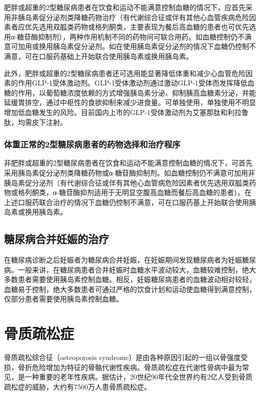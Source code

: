 肥胖或超重的2型糖尿病患者在饮食和运动不能满意控制血糖的情况下，应首先采用非胰岛素促分泌剂类降糖药物治疗（有代谢综合征或伴有其他心血管疾病危险因素者应优先选用双胍类药物或格列酮类，主要表现为餐后高血糖的患者也可优先选用α-糖苷酶抑制剂），两种作用机制不同的药物间可联合用药。如血糖控制仍不满意可加用或换用胰岛素促分泌剂。如在使用胰岛素促分泌剂的情况下血糖仍控制不满意，可在口服药基础上开始联合使用胰岛素或换用胰岛素。

此外，肥胖或超重的2型糖尿病患者还可选用能显著降低体重和减少心血管危险因素的作用GLP-1受体激动剂。GLP-1受体激动剂通过激动GLP-1受体而发挥降低血糖的作用，以葡萄糖浓度依赖的方式增强胰岛素分泌、抑制胰高血糖素分泌，并能延缓胃排空，通过中枢性的食欲抑制来减少进食量。可单独使用，单独使用不明显增加低血糖发生的风险。目前国内上市的GLP-1受体激动剂为艾塞那肽和利拉鲁肽，均需皮下注射。

\subsubsection{体重正常的2型糖尿病患者的药物选择和治疗程序}

非肥胖或超重的2型糖尿病患者在饮食和运动不能满意控制血糖的情况下，可首先采用胰岛素促分泌剂类降糖药物或α-糖苷酶抑制剂。如血糖控制仍不满意可加用非胰岛素促分泌剂（有代谢综合征或伴有其他心血管病危险因素者优先选用双胍类药物或格列酮类，α-糖苷酶抑剂适用于无明显空腹高血糖而餐后高血糖的患者）。在上述口服药联合治疗的情况下血糖仍控制不满意，可在口服药基上开始联合使用胰岛素或换用胰岛素。

\subsection{糖尿病合并妊娠的治疗}

在糖尿病诊断之后妊娠者为糖尿病合并妊娠，在妊娠期间发现糖尿病者为妊娠糖尿病。一般来讲，在糖尿病患者合并妊娠时血糖水平波动较大，血糖较难控制，绝大多数患者需要使用胰岛素控制血糖。相反，妊娠糖尿病患者的血糖波动相对较轻，血糖易于控制，绝大多数患者可通过严格的饮食计划和运动使血糖得到满意控制，仅部分患者需要使用胰岛素控制血糖。

\section{骨质疏松症}

骨质疏松综合征（osteoporosis
syndrome）是由各种原因引起的一组以骨强度受损，骨折危险增加为特征的骨骼代谢性疾病。骨质疏松症在代谢性骨病中最为常见，是一种重要的老年性疾病。据估计，20世纪90年代全世界约有2亿人受到骨质疏松症的威胁，大约有7500万人患骨质疏松症。

